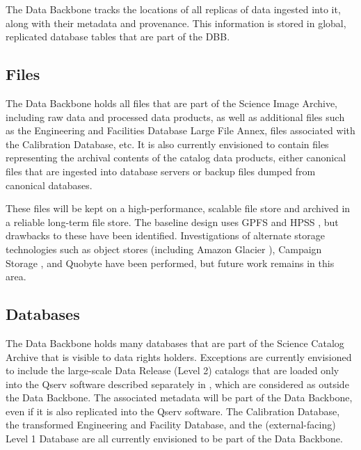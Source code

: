 \documentclass[DM,toc]{lsstdoc}
\begin{document}
The Data Backbone tracks the locations of all replicas of data ingested into
it, along with their metadata and provenance.  This information is stored in
global, replicated database tables that are part of the DBB.

\subsection{Files}\label{dbb-files}

The Data Backbone holds all files that are part of the Science Image Archive,
including raw data and processed data products, as well as additional files
such as the Engineering and Facilities Database Large File Annex, files
associated with the Calibration Database, etc.
It is also currently envisioned to contain files representing the archival contents of the catalog data products, either canonical files that are ingested into database servers or backup files dumped from canonical databases.

These files will be kept on a high-performance, scalable file store and
archived in a reliable long-term file store.  The baseline design uses GPFS
\citep{GPFS} and HPSS \citep{HPSS}, but drawbacks to these have been
identified.  Investigations of alternate storage technologies such as object
stores (including Amazon Glacier \citep{AmazonGlacier}), Campaign Storage
\citep{CampaignStorage}, and Quobyte \citep{Quobyte} have been performed, but
future work remains in this area.

\subsection{Databases}\label{dbb-databases}

The Data Backbone holds many databases that are part of the Science Catalog Archive that is visible to data rights holders.
Exceptions are currently envisioned to include the large-scale Data Release (Level 2) catalogs that are loaded only into the Qserv software described separately in , which are considered as outside the Data Backbone.
The associated metadata will be part of the Data Backbone, even if it is also replicated into the Qserv software.
The Calibration Database, the transformed Engineering and Facility Database, and the (external-facing) Level 1 Database are all currently envisioned to be part of the Data Backbone.
\end{document}
